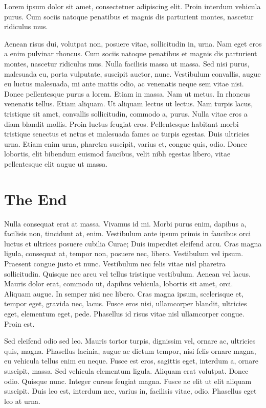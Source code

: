 \documentclass[../hdr.tex]{subfiles}
\begin{document}
Lorem ipsum dolor sit amet, consectetuer adipiscing elit. Proin interdum
vehicula purus. Cum sociis natoque penatibus et magnis dis parturient montes,
nascetur ridiculus mus.

Aenean risus dui, volutpat non, posuere vitae, sollicitudin in, urna. Nam eget
eros a enim pulvinar rhoncus. Cum sociis natoque penatibus et magnis dis
parturient montes, nascetur ridiculus mus. Nulla facilisis massa ut massa. Sed
nisi purus, malesuada eu, porta vulputate, suscipit auctor, nunc. Vestibulum
convallis, augue eu luctus malesuada, mi ante mattis odio, ac venenatis neque
sem vitae nisi. Donec pellentesque purus a lorem. Etiam in massa. Nam ut metus.
In rhoncus venenatis tellus. Etiam aliquam. Ut aliquam lectus ut lectus. Nam
turpis lacus, tristique sit amet, convallis sollicitudin, commodo a, purus.
Nulla vitae eros a diam blandit mollis. Proin luctus feugiat eros. Pellentesque
habitant morbi tristique senectus et netus et malesuada fames ac turpis egestas.
Duis ultricies urna. Etiam enim urna, pharetra suscipit, varius et, congue quis,
odio. Donec lobortis, elit bibendum euismod faucibus, velit nibh egestas libero,
vitae pellentesque elit augue ut massa.

\section{The End}
Nulla consequat erat at massa. Vivamus id mi. Morbi purus enim, dapibus a,
facilisis non, tincidunt at, enim. Vestibulum ante ipsum primis in faucibus orci
luctus et ultrices posuere cubilia Curae; Duis imperdiet eleifend arcu. Cras
magna ligula, consequat at, tempor non, posuere nec, libero. Vestibulum vel
ipsum. Praesent congue justo et nunc. Vestibulum nec felis vitae nisl pharetra
sollicitudin. Quisque nec arcu vel tellus tristique vestibulum. Aenean vel
lacus. Mauris dolor erat, commodo ut, dapibus vehicula, lobortis sit amet, orci.
Aliquam augue. In semper nisi nec libero. Cras magna ipsum, scelerisque et,
tempor eget, gravida nec, lacus. Fusce eros nisi, ullamcorper blandit, ultricies
eget, elementum eget, pede. Phasellus id risus vitae nisl ullamcorper congue.
Proin est.

Sed eleifend odio sed leo. Mauris tortor turpis, dignissim vel, ornare ac,
ultricies quis, magna. Phasellus lacinia, augue ac dictum tempor, nisi felis
ornare magna, eu vehicula tellus enim eu neque. Fusce est eros, sagittis eget,
interdum a, ornare suscipit, massa. Sed vehicula elementum ligula. Aliquam erat
volutpat. Donec odio. Quisque nunc. Integer cursus feugiat magna. Fusce ac elit
ut elit aliquam suscipit. Duis leo est, interdum nec, varius in, facilisis
vitae, odio. Phasellus eget leo at urna.
\end{document}
